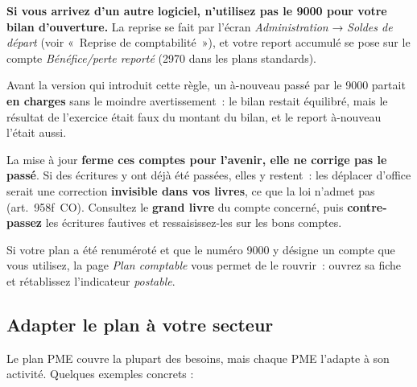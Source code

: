 \documentclass[a4paper,11pt,oneside]{article}
\begin{document}
\begin{keshwarning}
\textbf{Si vous arrivez d'un autre logiciel, n'utilisez pas le 9000 pour votre bilan d'ouverture.} La reprise se fait par l'écran \emph{Administration} → \emph{Soldes de départ} (voir «~Reprise de comptabilité~»), et votre report accumulé se pose sur le compte \emph{Bénéfice/perte reporté} (2970 dans les plans standards).

Avant la version qui introduit cette règle, un à-nouveau passé par le 9000 partait \textbf{en charges} sans le moindre avertissement~: le bilan restait équilibré, mais le résultat de l'exercice était faux du montant du bilan, et le report à-nouveau l'était aussi.
\end{keshwarning}

\begin{keshnote}
La mise à jour \textbf{ferme ces comptes pour l'avenir, elle ne corrige pas le passé}. Si des écritures y ont déjà été passées, elles y restent~: les déplacer d'office serait une correction \textbf{invisible dans vos livres}, ce que la loi n'admet pas (art.~958f~CO). Consultez le \textbf{grand livre} du compte concerné, puis \textbf{contre-passez} les écritures fautives et ressaisissez-les sur les bons comptes.

Si votre plan a été renuméroté et que le numéro 9000 y désigne un compte que vous utilisez, la page \emph{Plan comptable} vous permet de le rouvrir~: ouvrez sa fiche et rétablissez l'indicateur \emph{postable}.
\end{keshnote}

\subsection{Adapter le plan à votre secteur}

Le plan PME couvre la plupart des besoins, mais chaque PME l'adapte à son activité. Quelques exemples concrets :
\end{document}
